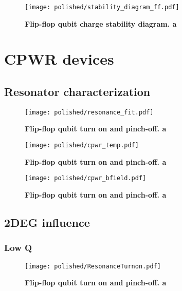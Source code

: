 \begin{figure}
	\centering
	\texttt{[image: polished/stability\_diagram\_ff.pdf]}
	\caption[Flip-flop qubit charge stability diagram]{\textbf{Flip-flop qubit charge stability diagram. a}}
	\label{fig:coulomb_oscillations}
\end{figure}


\section{CPWR devices} \label{sec:cpwr_meas}

\subsection{Resonator characterization}

\begin{figure}
	\centering
	\texttt{[image: polished/resonance\_fit.pdf]}
	\caption[Flip-flop qubit turn on and pinch-off]{\textbf{Flip-flop qubit turn on and pinch-off. a}}
	\label{fig:resonance_fit}
\end{figure}

\begin{figure}
	\centering
	\texttt{[image: polished/cpwr\_temp.pdf]}
	\caption[Flip-flop qubit turn on and pinch-off]{\textbf{Flip-flop qubit turn on and pinch-off. a}}
	\label{fig:cpwr_temp}
\end{figure}

\begin{figure}
	\centering
	\texttt{[image: polished/cpwr\_bfield.pdf]}
	\caption[Flip-flop qubit turn on and pinch-off]{\textbf{Flip-flop qubit turn on and pinch-off. a}}
	\label{fig:cpwr_bfield}
\end{figure}



\subsection{2DEG influence}

\subsubsection{Low Q}

\begin{figure}
	\centering
	\texttt{[image: polished/ResonanceTurnon.pdf]}
	\caption[Flip-flop qubit turn on and pinch-off]{\textbf{Flip-flop qubit turn on and pinch-off. a}}
	\label{fig:lowq_turnon}
\end{figure}

